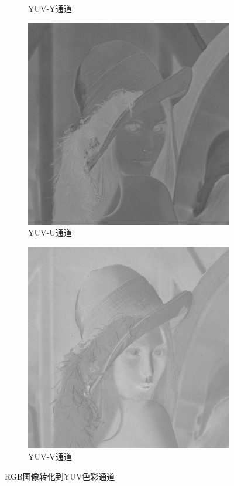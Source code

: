 \begin{figure}[ht]
\begin{subfigure}{0.245\textwidth}
      \caption{YUV-Y通道}
      \label{Fig:RGB2YUV-y}
    \end{subfigure}
    \begin{subfigure}{0.245\textwidth}
      \includegraphics[width=\linewidth]{pages/jpeg/yuv-u.jpg}
      \caption{YUV-U通道}
      \label{Fig:RGB2YUV-u}
    \end{subfigure}
    \begin{subfigure}{0.245\textwidth}
      \includegraphics[width=\linewidth]{pages/jpeg/yuv-v.jpg}
      \caption{YUV-V通道}
      \label{Fig:RGB2YUV-v}
    \end{subfigure}
    \caption{RGB图像转化到YUV色彩通道}
    \label{Fig:RGB2YUV}
\end{figure}


